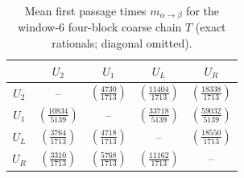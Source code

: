 \begin{table}[H]
\centering
\scriptsize
\setlength{\tabcolsep}{6pt}
\caption{Mean first passage times $m_{\alpha\to\beta}$ for the window-6 four-block coarse chain $T$ (exact rationals; diagonal omitted).}
\label{tab:window6_mean_first_passage_times}
\begin{tabular}{c c c c c}
\toprule
 & $U_2$ & $U_1$ & $U_L$ & $U_R$ \\
\midrule
$U_2$ & -- & $(\frac{4730}{1713})$ & $(\frac{11404}{1713})$ & $(\frac{18338}{1713})$ \\
$U_1$ & $(\frac{10834}{5139})$ & -- & $(\frac{33718}{5139})$ & $(\frac{59032}{5139})$ \\
$U_L$ & $(\frac{3764}{1713})$ & $(\frac{4718}{1713})$ & -- & $(\frac{18550}{1713})$ \\
$U_R$ & $(\frac{3310}{1713})$ & $(\frac{5768}{1713})$ & $(\frac{11162}{1713})$ & -- \\
\bottomrule
\end{tabular}
\end{table}
